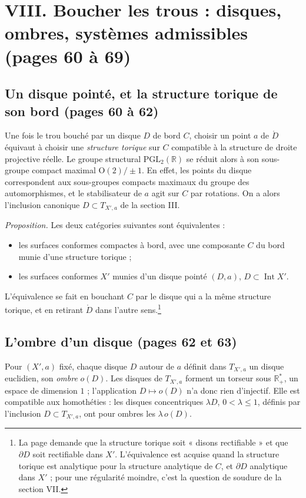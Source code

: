 \documentclass[11pt,a4paper]{article}
\begin{document}
\section*{VIII. Boucher les trous : disques, ombres, systèmes admissibles (pages 60 à 69)}

\subsection*{Un disque pointé, et la structure torique de son bord (pages 60 à 62)}

Une fois le trou bouché par un disque $D$ de bord $C$, choisir un point $a$ de
$\mathring D$ équivaut à choisir une \emph{structure torique} sur $C$
compatible à la structure de droite projective réelle. Le groupe structural
$\mathrm{PGL}_2(\mathbb{R})$ se réduit alors à son sous-groupe compact maximal
$\mathrm{O}(2)/\pm 1$. En effet, les points du disque correspondent aux
sous-groupes compacts maximaux du groupe des automorphismes, et le
stabilisateur de $a$ agit sur $C$ par rotations. On a alors l'inclusion
canonique $D \subset T_{X',a}$ de la section III.

\emph{Proposition.} Les deux catégories suivantes sont équivalentes :
\begin{itemize}
  \item[a)] les surfaces conformes compactes à bord, avec une composante $C$
  du bord munie d'une structure torique ;
  \item[b)] les surfaces conformes $X'$ munies d'un disque pointé $(D, a)$,
  $D \subset \operatorname{Int} X'$.
\end{itemize}
L'équivalence se fait en bouchant $C$ par le disque qui a la même structure
torique, et en retirant $\mathring D$ dans l'autre sens.\footnote{La page
demande que la structure torique soit « disons rectifiable » et que
$\partial D$ soit rectifiable dans $X'$. L'équivalence est acquise quand
la structure torique est analytique pour la structure analytique de $C$, et
$\partial D$ analytique dans $X'$ ; pour une régularité moindre, c'est la
question de soudure de la section VII.}

\subsection*{L'ombre d'un disque (pages 62 et 63)}

Pour $(X', a)$ fixé, chaque disque $D$ autour de $a$ définit dans
$T_{X',a}$ un disque euclidien, son \emph{ombre} $o(D)$. Les disques de
$T_{X',a}$ forment un torseur sous $\mathbb{R}^{*}_{+}$, un espace de dimension
$1$ ; l'application $D \mapsto o(D)$ n'a donc rien d'injectif. Elle est
compatible aux homothéties : les disques concentriques $\lambda D$,
$0 < \lambda \leqslant 1$, définis par l'inclusion $D \subset T_{X',a}$, ont
pour ombres les $\lambda\, o(D)$.
\end{document}

